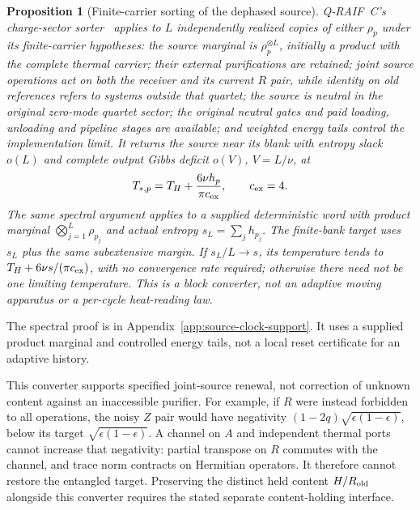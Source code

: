 \documentclass[12pt,a4paper]{article}
\newtheorem{proposition}[theorem]{Proposition}
\begin{document}
\begin{proposition}[Finite-carrier sorting of the dephased source]
\label{prop:pointer-sort}
Q-RAIF~C's charge-sector sorter~\cite{QRC} applies to $L$ independently
realized copies of either $\rho_p$ under its finite-carrier hypotheses:
the source marginal is $\rho_p^{\otimes L}$, initially a product with
the complete thermal carrier; their external purifications are retained;
joint source operations act on both the receiver and its current $R$
pair, while identity on old references refers to systems outside that
quartet;
the source is neutral in the original zero-mode quartet sector; the
original neutral gates and paid loading, unloading and pipeline stages
are available; and weighted energy tails control the implementation
limit. It returns the source near its blank with entropy slack $o(L)$
and complete output Gibbs deficit $o(V)$, $V=L/\nu$, at
\[
 T_{*,p}=T_H+\frac{6\nu h_p}{\pi c_{\rm ex}},\qquad c_{\rm ex}=4.
\]
The same spectral argument applies to a supplied deterministic word
with product marginal $\bigotimes_{j=1}^L\rho_{p_j}$ and actual entropy
$s_L=\sum_jh_{p_j}$. The finite-bank target uses $s_L$ plus the same
subextensive margin. If $s_L/L\to s$, its temperature tends to
$T_H+6\nu s/(\pi c_{\rm ex})$, with no convergence rate required;
otherwise there need not be one limiting temperature. This is a block
converter, not an adaptive moving apparatus or a per-cycle heat-reading law.
\end{proposition}
The spectral proof is in Appendix~\ref{app:source-clock-support}.
It uses a supplied product marginal and controlled energy tails, not
a local reset certificate for an adaptive history.

This converter supports specified joint-source renewal, not correction
of unknown content against an inaccessible purifier. For example, if
$R$ were instead forbidden to all operations, the noisy $Z$ pair would
have negativity $(1-2q)\sqrt{\epsilon(1-\epsilon)}$, below its target
$\sqrt{\epsilon(1-\epsilon)}$. A channel on $A$ and independent thermal
ports cannot increase that negativity: partial transpose on $R$
commutes with the channel, and trace norm contracts on Hermitian
operators. It therefore cannot restore the entangled target.
Preserving the distinct held content $H/R_{\rm old}$ alongside this
converter requires the stated separate content-holding interface.
\end{document}

